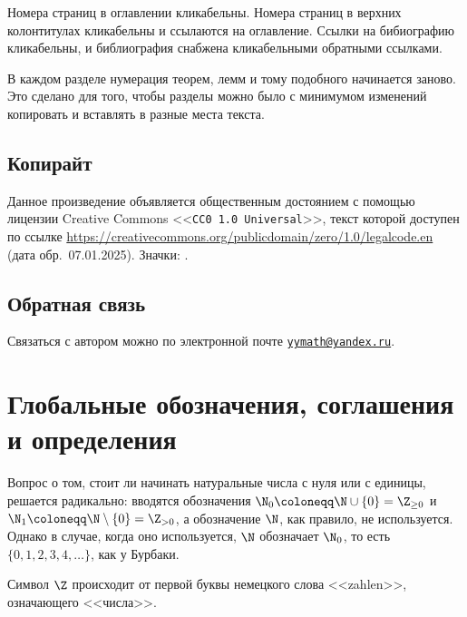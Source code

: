 \documentclass[
	extrafontsizes,
	11pt,
	hyphens,
]{memoir}
\begin{document}
Номера страниц в оглавлении кликабельны.
Номера страниц в верхних колонтитулах кликабельны и ссылаются на оглавление.
Ссылки на бибиографию кликабельны, и библиография снабжена кликабельными обратными ссылками.

В каждом разделе нумерация теорем, лемм и тому подобного начинается заново. Это сделано для того, чтобы разделы можно было с минимумом изменений копировать и вставлять в разные места текста.

\subsection{Копирайт}


Данное произведение объявляется общественным достоянием с помощью лицензии
\textenglish{Creative Commons <<\texttt{CC0 1.0 Universal}>>},
текст которой доступен по ссылке
\url{https://creativecommons.org/publicdomain/zero/1.0/legalcode.en} (дата обр.\ 07.01.2025).
Значки: \cczero.

\subsection{Обратная связь}

Связаться с автором можно по электронной почте
\href{mailto:yymath@yandex.ru}{\nolinkurl{yymath@yandex.ru}}.


\section{Глобальные обозначения, соглашения и определения}

\begin{notation}
Вопрос о том, стоит ли начинать натуральные числа с нуля или с единицы, решается радикально: вводятся обозначения
\(\N_0 \coloneqq \N \cup \{0\} = \Z_{\geq 0}\) и
\(\N_1 \coloneqq \N \setminus \{0\} = \Z_{> 0}\),
а обозначение \(\N\), как правило, не используется.
Однако в случае, когда оно используется, \(\N\) обозначает \(\N_0\), то есть \(\{0, 1, 2, 3, 4, \dots{}\}\), как у Бурбаки.
\end{notation}

\begin{remark}
Символ \(\Z\) происходит от первой буквы немецкого слова <<\textenglish{zahlen}>>, означающего <<числа>>.
\end{remark}
\end{document}
